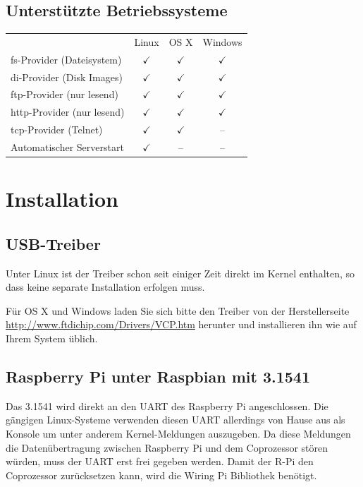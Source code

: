 \documentclass[10pt,a4paper]{scrartcl}		%
\begin{document}
\subsection{Unterstützte Betriebssysteme}
\begin{tabular}[c]{l c c c}
\toprule
& Linux & OS X & Windows \\
fs-Provider (Dateisystem) & $\checkmark$ & $\checkmark$ & $\checkmark$ \\
di-Provider (Disk Images) & $\checkmark$ & $\checkmark$ & $\checkmark$ \\
ftp-Provider (nur lesend) & $\checkmark$ & $\checkmark$ & $\checkmark$ \\
http-Provider (nur lesend) & $\checkmark$ & $\checkmark$ & $\checkmark$ \\
tcp-Provider (Telnet) & $\checkmark$ & $\checkmark$ & -- \\
Automatischer Serverstart & $\checkmark$ & -- & -- \\
\bottomrule
\end{tabular}

\section{Installation}
\subsection{USB-Treiber}
Unter Linux ist der Treiber schon seit einiger Zeit direkt im Kernel
enthalten, so dass keine separate Installation erfolgen muss.

Für OS X und Windows laden Sie sich bitte den Treiber von der
Herstellerseite \url{http://www.ftdichip.com/Drivers/VCP.htm} 
herunter und installieren ihn wie auf Ihrem System üblich.

\subsection{Raspberry Pi unter Raspbian mit 3.1541}
Das 3.1541 wird direkt an den UART des Raspberry Pi angeschlossen.
Die gängigen Linux-Systeme verwenden diesen UART allerdings von
Hause aus als Konsole um unter anderem Kernel-Meldungen auszugeben. 
Da diese Meldungen die Datenübertragung zwischen Raspberry Pi
und dem Coprozessor stören würden, muss der UART erst frei
gegeben werden. Damit der R-Pi den Coprozessor zurücksetzen kann,
wird die Wiring Pi Bibliothek benötigt.
\end{document}
